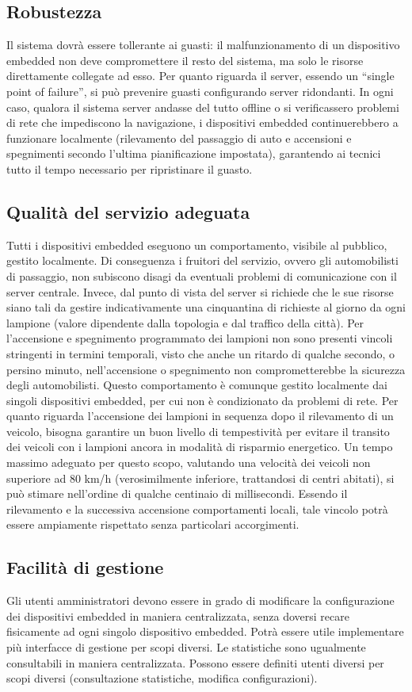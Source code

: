 \subsection{Robustezza}
Il sistema dovrà essere tollerante ai guasti: il malfunzionamento di un dispositivo embedded non deve compromettere il resto del sistema, ma solo le risorse direttamente collegate ad esso. Per quanto riguarda il server, essendo un ``single point of failure'', si può prevenire guasti configurando server ridondanti. In ogni caso, qualora il sistema server andasse del tutto offline o si verificassero problemi di rete che impediscono la navigazione, i dispositivi embedded continuerebbero a funzionare localmente (rilevamento del passaggio di auto e accensioni e spegnimenti secondo l'ultima pianificazione impostata), garantendo ai tecnici tutto il tempo necessario per ripristinare il guasto.
\subsection{Qualità del servizio adeguata}
Tutti i dispositivi embedded eseguono un comportamento, visibile al pubblico, gestito localmente. Di conseguenza i fruitori del servizio, ovvero gli automobilisti di passaggio, non subiscono disagi da eventuali problemi di comunicazione con il server centrale. Invece, dal punto di vista del server si richiede che le sue risorse siano tali da gestire indicativamente una cinquantina di richieste al giorno da ogni lampione (valore dipendente dalla topologia e dal traffico della città).
Per l'accensione e spegnimento programmato dei lampioni non sono presenti vincoli stringenti in termini temporali, visto che anche un ritardo di qualche secondo, o persino minuto, nell'accensione o spegnimento non comprometterebbe la sicurezza degli automobilisti. Questo comportamento è comunque gestito localmente dai singoli dispositivi embedded, per cui non è condizionato da problemi di rete.
Per quanto riguarda l'accensione dei lampioni in sequenza dopo il rilevamento di un veicolo, bisogna garantire un buon livello di tempestività per evitare il transito dei veicoli con i lampioni ancora in modalità di risparmio energetico. Un tempo massimo adeguato per questo scopo, valutando una velocità dei veicoli non superiore ad 80 km/h (verosimilmente inferiore, trattandosi di centri abitati), si può stimare nell'ordine di qualche centinaio di millisecondi. Essendo il rilevamento e la successiva accensione comportamenti locali, tale vincolo potrà essere ampiamente rispettato senza particolari accorgimenti.
\subsection{Facilità di gestione}
Gli utenti amministratori devono essere in grado di modificare la configurazione dei dispositivi embedded in maniera centralizzata, senza doversi recare fisicamente ad ogni singolo dispositivo embedded. Potrà essere utile implementare più interfacce di gestione per scopi diversi. Le statistiche sono ugualmente consultabili in maniera centralizzata. Possono essere definiti utenti diversi per scopi diversi (consultazione statistiche, modifica configurazioni).
